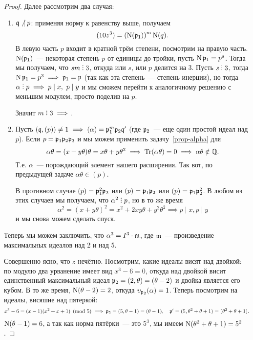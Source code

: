 \begin{proof}
	  	Далее рассмотрим два случая:

	  	\begin{enumerate}
	  		\item $\fq \not\ \mid p$: применяя норму к равенству выше, получаем 
	  		\[
	  			(10z^3) = \lr*{\Nm(\fp_1)}^m \Nm(q).
	  		\]
	  		В левую часть $p$ входит в кратной трём степени, посмотрим на правую часть. $\Nm(\fp_1)$~--- некоторая степень $p$ от единицы до тройки, пусть $\Nm{\fp_{1}} = p^s$. Тогда мы получаем, что $sm \divby 3$, откуда или $s$, или $p$ делится на 3. Пусть $s \divby 3$, тогда $\Nm{\fp_{1}} = p^3 \implies \fp_{1} = \fp$ (так как эта степень~---  степень инерции), но тогда $\alpha \divby p \implies p \mid x, \ p \mid y$ и мы сможем перейти к аналогичному решению с меньшим модулем, просто поделив на $p$. 

	  		Значит $m \divby 3 \implies$. 

	  		\item Пусть $(\fq, (p)) \neq 1 \implies (\alpha) = \fp_{1}^m \fp_{2} \fq'$ (где $\fp_{2}$~--- еще один простой идеал над $p$). Если $p = \fp_1 \fp_2 \fp_3$ и мы можем применить задачу~\ref{prop-alpha} для 
	  		\[
	  		 	\alpha\theta = (x + y\theta)\theta = x\theta + y\theta^2 \implies \Tr(\alpha\theta) = 0 \implies \alpha\theta \notin \Q.
	  		 \] 
	  		 Т.е. $\alpha$~--- порождающий элемент нашего расширения. Так вот, по предыдущей задаче $\alpha \theta \in (p)$.

	  		 В противном случае $(p) = \fp_1^2 \fp_2$ или $(p) = \fp_1 \fp_2$ или $(p) = \fp_1 \fp_2^2$. В любом из этих случаев мы получаем, что $\alpha^2 \divby p$, но в то же время 
	  		 \[
	  		 	\alpha^2  = (x + y\theta)^2 = x^2 + 2xy\theta + y^2\theta^2 \implies p \mid x, p \mid y
	  		 \]
	  		 и мы снова можем сделать спуск. 
	  	\end{enumerate}
	  	
	  	Теперь мы можем заключить, что $\alpha^3 = I^3 \cdot \fm$, где $\fm$~--- произведение максимальных идеалов над 2 и над 5.  

	  	Совершенно ясно, что $z$ нечётно. Посмотрим, какие идеалы висят над двойкой: по модулю два урванение имеет вид $x^3 - 6 = 0$, откуда над двойкой висит единственный максимальный идеал $\fp_{2} = (2, \theta) = (\theta - 2)$ и двойка является его кубом. В то же время, $\Nm(\theta - 2) = 2$, откуда  $\v_{\fp_{2}}(\alpha)= 1$. Теперь посмотрим на идеалы, висяшие над пятеркой: 
	  	\[
	  		x^3 - 6 = (x - 1)(x^2 + x + 1) \pmod{5} \implies \fp_{5} = (5, \theta - 1) = (\theta - 1), \quad \fp' = (5, \theta^2 + \theta + 1) = (\theta^2 + \theta + 1).
	  	\]
	  	$\Nm(\theta - 1) = 6$, а так как норма пятёрки~--- это $5^3$, мы имеем $\Nm(\theta^2 + \theta + 1) = 5^2$. 


\end{proof}
